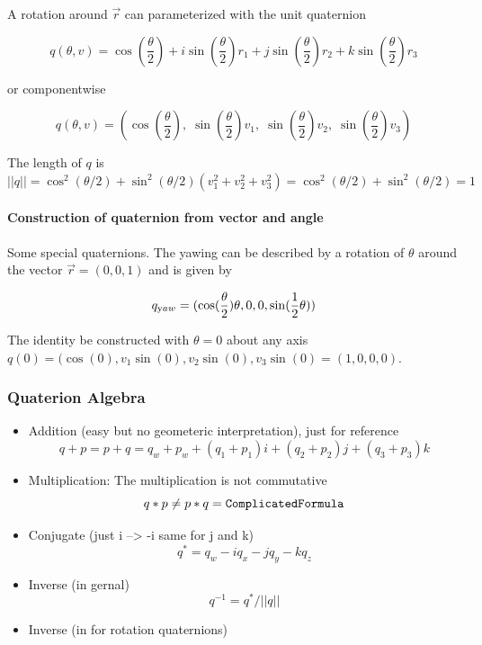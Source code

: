 \documentclass[
  letterpaper,
  DIV=11,
  numbers=noendperiod]{scrartcl}
\let\oldparagraph\paragraph
\renewcommand{\paragraph}[1]{\oldparagraph{#1}\mbox{}}
\begin{document}
A rotation around \(\vec{r}\) can parameterized with the unit quaternion

\[
  q(\theta, v) = \cos(\frac{\theta}{2}) + i \sin(\frac{\theta}{2}) r_1 +
  j \sin(\frac{\theta}{2}) r_2 + k \sin(\frac{\theta}{2}) r_3 
\]

or componentwise

\[
 q(\theta, v) =  \left(\cos(\frac{\theta}{2}),\; \sin(\frac{\theta}{2})  v_1, \;\sin(\frac{\theta} {2}) v_2, \;\sin(\frac{\theta}{2}) v_3 \right)
\]

The length of \(q\) is
\(||q||=\cos^2(\theta/2) + \sin^2(\theta/2) (v_1^2 + v_2^2 + v_3^2) = \cos^2(\theta/2) + \sin^2(\theta/2) = 1\)

\hypertarget{construction-of-quaternion-from-vector-and-angle}{%
\paragraph{Construction of quaternion from vector and
angle}\label{construction-of-quaternion-from-vector-and-angle}}

Some special quaternions. The yawing can be described by a rotation of
\(\theta\) around the vector \(\vec{r} = (0,0,1)\) and is given by

\[
q_{\text yaw} = (\cos(\frac{\theta}{2}) \theta, 0, 0, \sin(\frac{1}{2} \theta))
\]

The identity be constructed with \(\theta=0\) about any axis
\(q(0) = (\cos(0), v_1 \sin(0), v_2 \sin(0), v_3 \sin(0) = (1,0,0,0)\).

\hypertarget{quaterion-algebra}{%
\subsubsection{Quaterion Algebra}\label{quaterion-algebra}}

\begin{itemize}
\item
  Addition (easy but no geometeric interpretation), just for reference
  \[
  q + p = p + q =  q_w + p_w + (q_1 + p_1) i + (q_2 + p_2) j + (q_3 + p_3) k
  \]
\item
  Multiplication: The multiplication is not commutative \[
  q * p \ne p * q = \tt{Complicated Formula}
  \]
\item
  Conjugate (just i --\textgreater{} -i same for j and k) \[
  q^* = q_w − i q_x − j q_y − k q_z
  \]
\item
  Inverse (in gernal) \[
  q^{-1} = q^*/||q||
  \]
\item
  Inverse (in for rotation quaternions)
\end{itemize}
\end{document}
